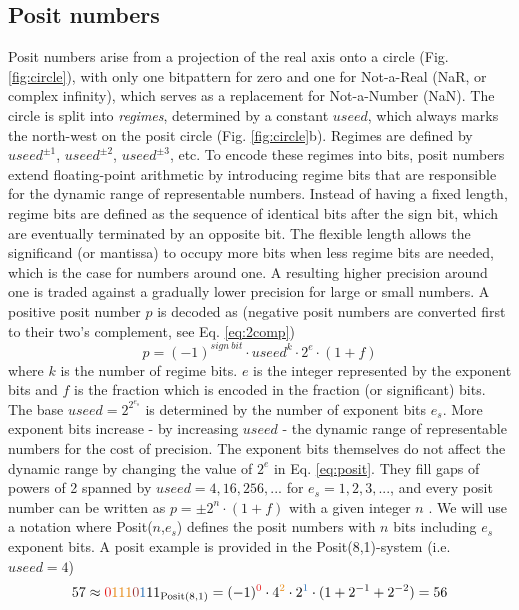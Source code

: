	\subsection{Posit numbers}
	\label{sec:posits}

Posit numbers arise from a projection of the real axis onto a circle (Fig. \ref{fig:circle}), with only one bitpattern for zero and one
for Not-a-Real (NaR, or complex infinity), which serves as a replacement for Not-a-Number (NaN). The circle is split into
\emph{regimes}, determined by a constant $useed$, which always marks the north-west on the posit circle (Fig. \ref{fig:circle}b).
Regimes are defined by $useed^{\pm1}$, $useed^{\pm2}$, $useed^{\pm3}$, etc. To encode these regimes into bits, posit
numbers extend floating-point arithmetic by introducing regime bits that are responsible for the dynamic range of representable
numbers. Instead of having a fixed length, regime bits are defined as the sequence of identical bits after the sign bit, which are
eventually terminated by an opposite bit. The flexible length allows the significand (or mantissa) to occupy more bits when less
regime bits are needed, which is the case for numbers around one. A resulting higher precision around one is traded against a
gradually lower precision for large or small numbers. A positive posit number $p$ is decoded as
\citep{Gustafson2017,Gustafson2017a,Klower2019} (negative posit numbers are converted first to their two's complement, see
Eq. \ref{eq:2comp})
\begin{equation}
p = (-1)^{sign~bit} \cdot useed^k \cdot 2^e \cdot (1+f)
\label{eq:posit}
\end{equation}
where $k$ is the number of regime bits. $e$ is the integer represented by the exponent bits and $f$ is the fraction which is
encoded in the fraction (or significant) bits. The base $useed = 2^{2^{e_s}}$ is determined by the number of exponent bits
$e_s$. More exponent bits increase - by increasing $useed$ - the dynamic range of representable numbers for the cost of precision.
The exponent bits themselves do not affect the dynamic range by changing the value of $2^e$ in Eq. \ref{eq:posit}. They fill gaps of
powers of 2 spanned by $useed = 4,16,256,...$ for $e_s=1,2,3,...$, and every posit number can be written as $p = \pm 2^n \cdot (1+f)$
with a given integer $n$ \citep{Gustafson2017,Chen2018}. We will use a notation where Posit($n$,$e_s$) defines the posit numbers
with $n$ bits including $e_s$ exponent bits. A posit example is provided in the Posit(8,1)-system (i.e. $useed = 4$)
\begin{equation}
57 \approx {\color{psign}0}{\color{pregime}111}{\color{pregimet}0}{\color{pexpo}1}11_{\op{Posit}(8,1)} = (-1)^{\color{psign}0}
\cdot 4^{\color{pregime}2} \cdot 2^{\color{pexpo}1} \cdot (1+2^{-1}+2^{-2}) = 56
\label{eq:posit_pos}
\end{equation}
